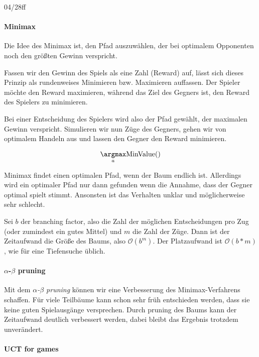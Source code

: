 \documentclass[ngerman]{../LaTeX-Templates/Paper/paper}
\begin{document}
04/28ff
\paragraph{Minimax}
Die Idee des Minimax ist, den Pfad auszuwählen, der bei optimalem Opponenten noch den größten Gewinn verspricht.

Fassen wir den Gewinn des Spiels als eine Zahl (Reward) auf, lässt sich dieses Prinzip als rundenweises Minimieren bzw. Maximieren auffassen.
Der Spieler möchte den Reward maximieren, während das Ziel des Gegners ist, den Reward des Spielers zu minimieren. 

Bei einer Entscheidung des Spielers wird also der Pfad gewählt, der maximalen Gewinn verspricht. Simulieren wir nun Züge des Gegners, gehen wir von optimalem Handeln aus und lassen den Gegner den Reward minimieren. 

\begin{equation*}
	\underset a\argmax \mathrm{MinValue}()
\end{equation*}






Minimax findet einen optimalen Pfad, wenn der Baum endlich ist.
Allerdings wird ein optimaler Pfad nur dann gefunden wenn die Annahme, dass der Gegner optimal spielt stimmt. Ansonsten ist das Verhalten unklar und möglicherweise sehr schlecht.

Sei $b$ der branching factor, also die Zahl der möglichen Entscheidungen pro Zug (oder zumindest ein gutes Mittel) und $m$ die Zahl der Züge. Dann ist der Zeitaufwand die Größe des Baums, also $\mathcal O(b^m)$. Der Platzaufwand ist $\mathcal O(b*m)$, wie für eine Tiefensuche üblich.

\paragraph{$\alpha$-$\beta$ pruning}
Mit dem \emph{$\alpha$-$\beta$ pruning} können wir eine Verbesserung des Minimax-Verfahrens schaffen. 
Für viele Teilbäume kann schon sehr früh entschieden werden, dass sie keine guten Spielausgänge versprechen. Durch pruning des Baums kann der Zeitaufwand deutlich verbessert werden, dabei bleibt das Ergebnis trotzdem unverändert.



\paragraph{UCT for games}
\end{document}
